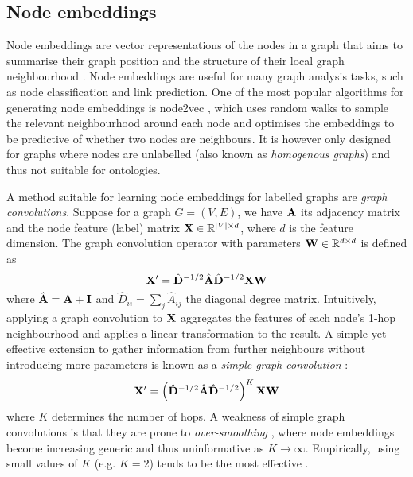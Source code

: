 \subsection{Node embeddings}  \label{sec:node-embeddings}

Node embeddings are vector representations of the nodes in a graph that aims to summarise their graph position and the structure of their local graph neighbourhood \cite{hamilton2020graph}. Node embeddings are useful for many graph analysis tasks, such as node classification and link prediction. One of the most popular algorithms for generating node embeddings is node2vec \cite{grover2016node2vec}, which uses random walks to sample the relevant neighbourhood around each node and optimises the embeddings to be predictive of whether two nodes are neighbours. It is however only designed for graphs where nodes are unlabelled (also known as \emph{homogenous graphs}) and thus not suitable for ontologies.

A method suitable for learning node embeddings for labelled graphs are \emph{graph convolutions}. Suppose for a graph $G = (V, E)$, we have $\mathbf{A}$ its adjacency matrix and the node feature (label) matrix $\mathbf{X} \in \mathbb{R}^{|V| \times d}$, where $d$ is the feature dimension. The graph convolution operator with parameters $\mathbf{W} \in \mathbb{R}^{d \times d}$ is defined as
\[
    \mathbf{X}' = \hat{\mathbf{D}}^{-1/2} \hat{\mathbf{A}} \hat{\mathbf{D}}^{-1/2} \mathbf{X} \mathbf{W}
\]
where $\hat{\mathbf{A}} = \mathbf{A} + \mathbf{I}$ and $\hat{D}_{ii} = \sum_j \hat{A}_{ij}$ the diagonal degree matrix. Intuitively, applying a graph convolution to $\mathbf{X}$ aggregates the features of each node's 1-hop neighbourhood and applies a linear transformation to the result. A simple yet effective extension to gather information from further neighbours without introducing more parameters is known as a \emph{simple graph convolution} \cite{wu2019simplifying}:
\begin{equation}  \label{eq:simple-graph-conv}
    \mathbf{X}' = \left(\hat{\mathbf{D}}^{-1/2} \hat{\mathbf{A}} \hat{\mathbf{D}}^{-1/2}\right)^K \mathbf{X} \mathbf{W}
\end{equation}
where $K$ determines the number of hops. A weakness of simple graph convolutions is that they are prone to \emph{over-smoothing} \cite{zhu2020simple}, where node embeddings become increasing generic and thus uninformative as $K \to \infty$. Empirically, using small values of $K$ (e.g. $K = 2$) tends to be the most effective \cite{wu2019simplifying}.